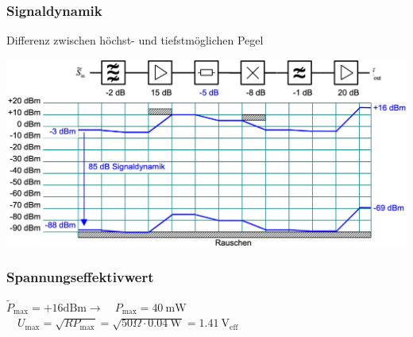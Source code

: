 \subsubsection{Signaldynamik}
Differenz zwischen höchst- und tiefstmöglichen Pegel
\vspace{-8pt}
\begin{center}
    \includegraphics[width=\linewidth]{graphic/signalparameter/uebung.png}
\end{center}
\vspace{-8pt}


\subsubsection{Spannungseffektivwert}
$\widetilde{P}_{\max }=+16 \mathrm{dBm} \rightarrow \quad P_{\max }=40 \mathrm{~mW} $\\
$\quad U_{\max }=\sqrt{R P_{\max }}=\sqrt{50 \Omega \cdot 0.04 \mathrm{~W}}=1.41 \mathrm{~V}_{\mathrm{eff}}$


